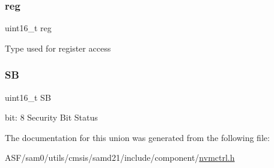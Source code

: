 \subsubsection{\texorpdfstring{reg}{reg}}
{\footnotesize\ttfamily uint16\+\_\+t reg}

Type used for register access \mbox{\label{union_n_v_m_c_t_r_l___s_t_a_t_u_s___type_ac17f518cfb257b6a7cef03bb3ad53eff}} 
\subsubsection{\texorpdfstring{SB}{SB}}
{\footnotesize\ttfamily uint16\+\_\+t SB}

bit\+: 8 Security Bit Status 

The documentation for this union was generated from the following file\+:\begin{DoxyCompactItemize}
\item 
A\+S\+F/sam0/utils/cmsis/samd21/include/component/\mbox{\hyperlink{component_2nvmctrl_8h}{nvmctrl.\+h}}\end{DoxyCompactItemize}
